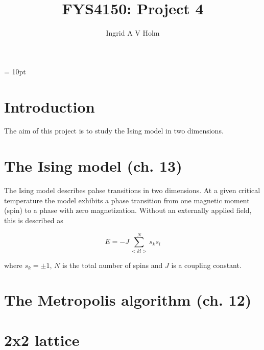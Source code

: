 \documentclass[11pt]{article}
\begin{document}
\title{FYS4150: Project 4}
\author{Ingrid A V Holm}
\maketitle


\marginparwidth = 10pt


\section{Introduction}

\begin{flushleft}
The aim of this project is to study the Ising model in two dimensions.
\end{flushleft}

\section{The Ising model (ch. 13)}

\begin{flushleft}
The Ising model describes pahse transitions in two dimensions. At a given critical temperature the model exhibits a phase transition from one magnetic moment (spin) to a phase with zero magnetization. Without an externally applied field, this is described as

\begin{equation}
E = -J \sum^N_{<kl>} s_k s_l
\end{equation}

where $s_k = \pm 1$, $N$ is the total number of spins and $J$ is a coupling constant.
\end{flushleft}

\section{The Metropolis algorithm (ch. 12)}

\begin{flushleft}

\end{flushleft}


\section{2x2 lattice}
\end{document}
